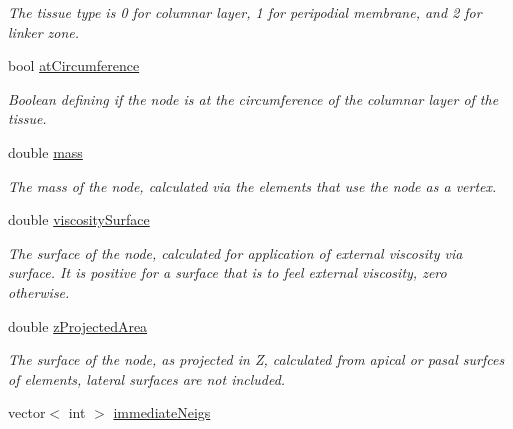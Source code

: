 \begin{DoxyCompactItemize}
\begin{DoxyCompactList}\small\item\em The tissue type is 0 for columnar layer, 1 for peripodial membrane, and 2 for linker zone. \end{DoxyCompactList}\item 
\hypertarget{classNode_ab6b225354ad961f2e9bd5d7fe9b67b3a}{}bool \hyperlink{classNode_ab6b225354ad961f2e9bd5d7fe9b67b3a}{at\+Circumference}\label{classNode_ab6b225354ad961f2e9bd5d7fe9b67b3a}

\begin{DoxyCompactList}\small\item\em Boolean defining if the node is at the circumference of the columnar layer of the tissue. \end{DoxyCompactList}\item 
\hypertarget{classNode_a63e510fc9158eb15e751861bc14eae38}{}double \hyperlink{classNode_a63e510fc9158eb15e751861bc14eae38}{mass}\label{classNode_a63e510fc9158eb15e751861bc14eae38}

\begin{DoxyCompactList}\small\item\em The mass of the node, calculated via the elements that use the node as a vertex. \end{DoxyCompactList}\item 
\hypertarget{classNode_a7a585da74654d80d5f94805e39c1e2ad}{}double \hyperlink{classNode_a7a585da74654d80d5f94805e39c1e2ad}{viscosity\+Surface}\label{classNode_a7a585da74654d80d5f94805e39c1e2ad}

\begin{DoxyCompactList}\small\item\em The surface of the node, calculated for application of external viscosity via surface. It is positive for a surface that is to feel external viscosity, zero otherwise. \end{DoxyCompactList}\item 
\hypertarget{classNode_af8e9678dfeffc9e99d925a83b58fde3d}{}double \hyperlink{classNode_af8e9678dfeffc9e99d925a83b58fde3d}{z\+Projected\+Area}\label{classNode_af8e9678dfeffc9e99d925a83b58fde3d}

\begin{DoxyCompactList}\small\item\em The surface of the node, as projected in Z, calculated from apical or pasal surfces of elements, lateral surfaces are not included. \end{DoxyCompactList}\item 
\hypertarget{classNode_ab22060fb9f61a0d93ec52e6045828782}{}vector$<$ int $>$ \hyperlink{classNode_ab22060fb9f61a0d93ec52e6045828782}{immediate\+Neigs}\label{classNode_ab22060fb9f61a0d93ec52e6045828782}


\end{DoxyCompactItemize}
